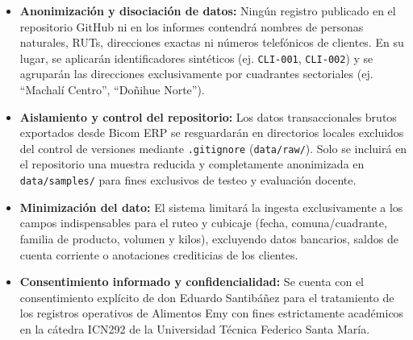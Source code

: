 \documentclass[10pt,a4paper]{article}
\begin{document}
\begin{itemize}[leftmargin=1.2cm]
\item \textbf{Anonimización y disociación de datos:} Ningún registro publicado en el repositorio GitHub ni en los informes contendrá nombres de personas naturales, RUTs, direcciones exactas ni números telefónicos de clientes. En su lugar, se aplicarán identificadores sintéticos (ej. \texttt{CLI-001}, \texttt{CLI-002}) y se agruparán las direcciones exclusivamente por cuadrantes sectoriales (ej. ``Machalí Centro'', ``Doñihue Norte'').
\item \textbf{Aislamiento y control del repositorio:} Los datos transaccionales brutos exportados desde Bicom ERP se resguardarán en directorios locales excluidos del control de versiones mediante \texttt{.gitignore} (\texttt{data/raw/}). Solo se incluirá en el repositorio una muestra reducida y completamente anonimizada en \texttt{data/samples/} para fines exclusivos de testeo y evaluación docente.
\item \textbf{Minimización del dato:} El sistema limitará la ingesta exclusivamente a los campos indispensables para el ruteo y cubicaje (fecha, comuna/cuadrante, familia de producto, volumen y kilos), excluyendo datos bancarios, saldos de cuenta corriente o anotaciones crediticias de los clientes.
\item \textbf{Consentimiento informado y confidencialidad:} Se cuenta con el consentimiento explícito de don Eduardo Santibáñez para el tratamiento de los registros operativos de Alimentos Emy con fines estrictamente académicos en la cátedra ICN292 de la Universidad Técnica Federico Santa María.
\end{itemize}

\end{document}
